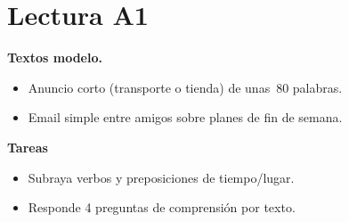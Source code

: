 \section{Lectura A1}
\textbf{Textos modelo.}
\begin{itemize}[leftmargin=*]
  \item Anuncio corto (transporte o tienda) de unas~80 palabras.
  \item Email simple entre amigos sobre planes de fin de semana.
\end{itemize}

\textbf{Tareas}
\begin{itemize}[leftmargin=*]
  \item Subraya verbos y preposiciones de tiempo/lugar.
  \item Responde 4 preguntas de comprensión por texto.
\end{itemize}

